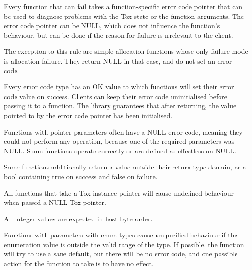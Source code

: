 Every function that can fail takes a function-\/specific error code pointer that can be used to diagnose problems with the Tox state or the function arguments. The error code pointer can be N\+U\+L\+L, which does not influence the function's behaviour, but can be done if the reason for failure is irrelevant to the client.

The exception to this rule are simple allocation functions whose only failure mode is allocation failure. They return N\+U\+L\+L in that case, and do not set an error code.

Every error code type has an O\+K value to which functions will set their error code value on success. Clients can keep their error code uninitialised before passing it to a function. The library guarantees that after returning, the value pointed to by the error code pointer has been initialised.

Functions with pointer parameters often have a N\+U\+L\+L error code, meaning they could not perform any operation, because one of the required parameters was N\+U\+L\+L. Some functions operate correctly or are defined as effectless on N\+U\+L\+L.

Some functions additionally return a value outside their return type domain, or a bool containing true on success and false on failure.

All functions that take a Tox instance pointer will cause undefined behaviour when passed a N\+U\+L\+L Tox pointer.

All integer values are expected in host byte order.

Functions with parameters with enum types cause unspecified behaviour if the enumeration value is outside the valid range of the type. If possible, the function will try to use a sane default, but there will be no error code, and one possible action for the function to take is to have no effect. 